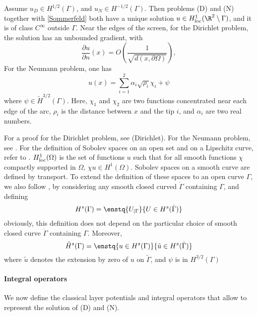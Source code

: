 \documentclass[]{article}
\begin{document}
\begin{The} Assume $u_D \in H^{1/2}(\Gamma)$, and $u_N \in H^{-1/2}(\Gamma)$. Then problems (D) and (N) together with \eqref{Sommerfeld} both have a unique solution $u \in H^1_\textup{loc}(\R^2 \setminus \Gamma)$, and it is of class $C^{\infty}$ outside $\Gamma$. Near the edges of the screen, for the Dirichlet problem, the solution has an unbounded gradient, with
\[\dfrac{\partial u}{\partial n}(x) = O\left(\frac{1}{\sqrt{d(x,\partial \Omega)}}\right),\]
For the Neumann problem, one has
\[u(x) = \sum_{i=1}^2 \alpha_i \sqrt{\rho_i}\chi_i + \psi\]
where $\psi \in \tilde{H}^{3/2}(\Gamma)$. Here, $\chi_1$ and $\chi_2$ are two functions concentrated near each edge of the arc, $\rho_i$ is the distance between $x$ and the tip $i$, and $\alpha_i$ are two real numbers. 
\end{The}
For a proof for the Dirichlet problem, see \cite{stephan1984augmented} (Dirichlet). For the Neumann problem, see \cite{wendland1990hypersingular,monch1996numerical}.
For the definition of Sobolev spaces on an open set and on a Lipschitz curve, refer to \cite{mclean2000strongly}. $H^{1}_\textup{loc}(\Omega)$ is the set of functions $u$ such that for all smooth functions $\chi$ compactly supported in $\Omega$, $\chi u \in H^1(\Omega)$. Sobolev spaces on a smooth curve are defined by transport. To extend the definition of these spaces to an open curve $\Gamma$, we also follow \cite{mclean2000strongly}, by considering any smooth closed curved $\dot{\Gamma}$ containing $\Gamma$, and defining 
\[H^s(\Gamma) = \enstq{U_{|\Gamma}}{ U \in H^s(\dot{\Gamma}) }\]
obviously, this definition does not depend on the particular choice of smooth closed curve $\dot{\Gamma}$ containing $\Gamma$. Moreover,
\[\tilde{H}^s(\Gamma) = \enstq{u \in H^s(\Gamma)}{\tilde{u} \in H^s(\dot{\Gamma})}\]
where $\tilde{u}$ denotes the extension by zero of $u$ on $\tilde{\Gamma}$, and $\psi$ is in $H^{3/2}(\Gamma)$ 
  
\paragraph{Integral operators}

We now define the classical layer potentials and integral operators that allow to represent the solution of (D) and (N). 
\end{document}
